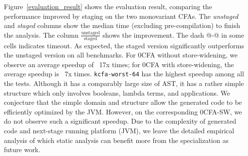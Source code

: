 Figure~\ref{evaluation_result} shows the evaluation result, comparing the
performance improved by staging on the two monovariant CFAs. The
\textit{unstaged} and \textit{staged} columns show the median time (excluding
pre-compilation) to finish the analysis. The column
$\frac{\text{unstaged}}{\text{staged}}$ shows the improvement. The dash @-@ in
some cells indicates timeout.  As expected, the staged version significantly
outperforms the unstaged version on all benchmarks.
For 0CFA without store-widening, we observe an average speedup of ~17x times;
for 0CFA with store-widening, the average speedup is ~7x times.
\texttt{kcfa-worst-64} has the highest speedup among all the tests. Although it
has a comparably large size of AST, it has a rather simple structure which only
involves booleans, lambda terms, and applications. We conjecture that the simple
domain and structure allow the generated code to be efficiently optimized by the
JVM. However, on the corresponding 0CFA-SW, we do not observe such a significant
speedup. Due to the complexity of generated code and next-stage running platform
(JVM), we leave the detailed empirical analysis of which static analysis can
benefit more from the specialization as future work.


